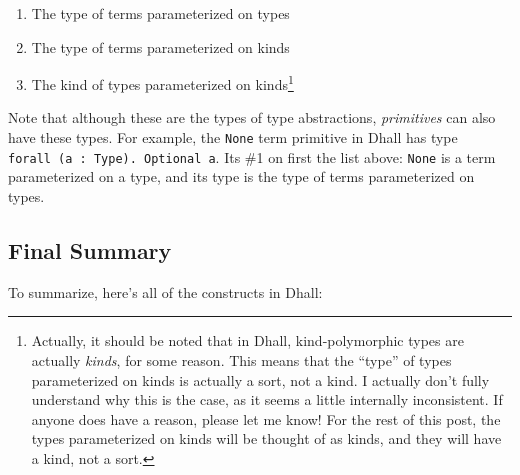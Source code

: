\documentclass[]{article}
\begin{document}
\begin{enumerate}
\def\labelenumi{\arabic{enumi}.}
\tightlist
\item
  The type of terms parameterized on types
\item
  The type of terms parameterized on kinds
\item
  The kind of types parameterized on kinds\footnote{Actually, it should be noted
    that in Dhall, kind-polymorphic types are actually \emph{kinds}, for some
    reason. This means that the ``type'' of types parameterized on kinds is
    actually a sort, not a kind. I actually don't fully understand why this is
    the case, as it seems a little internally inconsistent. If anyone does have
    a reason, please let me know! For the rest of this post, the types
    parameterized on kinds will be thought of as kinds, and they will have a
    kind, not a sort.}
\end{enumerate}

Note that although these are the types of type abstractions, \emph{primitives}
can also have these types. For example, the \texttt{None} term primitive in
Dhall has type \texttt{forall\ (a\ :\ Type).\ Optional\ a}. Its \#1 on first the
list above: \texttt{None} is a term parameterized on a type, and its type is the
type of terms parameterized on types.

\subsection{Final Summary}\label{final-summary}

To summarize, here's all of the constructs in Dhall:
\end{document}
